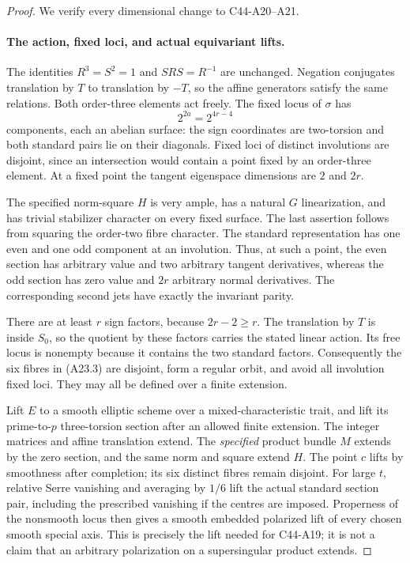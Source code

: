\documentclass[11pt]{article}
\theoremstyle{remark}\newtheorem{remark}[theorem]{Remark}
\begin{document}
\begin{proof}
We verify every dimensional change to C44-A20--A21.

\paragraph{The action, fixed loci, and actual equivariant lifts.}
The identities $R^3=S^2=1$ and $SRS=R^{-1}$ are unchanged.  Negation
conjugates translation by $T$ to translation by $-T$, so the affine
generators satisfy the same relations.  Both order-three elements act
freely.  The fixed locus of $\sigma$ has
\[
                 2^{2a}=2^{4r-4}
 \tag{A23.6}
\]
components, each an abelian surface: the sign coordinates are two-torsion
and both standard pairs lie on their diagonals.  Fixed loci of distinct
involutions are disjoint, since an intersection would contain a point
fixed by an order-three element.  At a fixed point the tangent
eigenspace dimensions are $2$ and $2r$.

The specified norm-square $H$ is very ample, has a natural
$G$ linearization, and has trivial stabilizer character on every fixed
surface.  The last assertion follows from squaring the order-two fibre
character.  The standard representation has one even and one odd
component at an involution.  Thus, at such a point, the even section
has arbitrary value and two arbitrary tangent derivatives, whereas
the odd section has zero value and $2r$ arbitrary normal derivatives.
The corresponding second jets have exactly the invariant parity.

There are at least $r$ sign factors, because $2r-2\geq r$.
The translation by $T$ is inside $S_0$, so the quotient by these factors
carries the stated linear action.  Its free locus is nonempty because
it contains the two standard factors.  Consequently the six fibres
in (A23.3) are disjoint, form a regular orbit, and avoid all involution
fixed loci.  They may all be defined over a finite extension.

Lift $E$ to a smooth elliptic scheme over a mixed-characteristic trait,
and lift its prime-to-$p$ three-torsion section after an allowed finite
extension.  The integer matrices and affine translation extend.  The
\emph{specified} product bundle $M$ extends by the zero section, and
the same norm and square extend $H$.  The point $c$ lifts by smoothness
after completion; its six distinct fibres remain disjoint.  For large
$t$, relative Serre vanishing and averaging by $1/6$ lift the actual
standard section pair, including the prescribed vanishing if the
centres are imposed.  Properness of the nonsmooth locus then gives a
smooth embedded polarized lift of every chosen smooth special axis.
This is precisely the lift needed for C44-A19; it is not a claim that
an arbitrary polarization on a supersingular product extends.


\end{proof}
\end{document}
